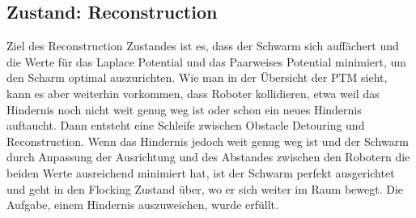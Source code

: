 \subsection{Zustand: Reconstruction}

Ziel des Reconstruction Zustandes ist es, dass der Schwarm sich auffächert und die Werte für das Laplace
Potential und das Paarweises Potential minimiert, um den Scharm optimal auszurichten.
Wie man in der Übersicht der PTM sieht, kann es aber weiterhin vorkommen, dass Roboter kollidieren, etwa weil
das Hindernis noch nicht weit genug weg ist oder schon ein neues Hindernis auftaucht. Dann entsteht eine
Schleife zwischen Obstacle Detouring und Reconstruction. Wenn das Hindernis jedoch weit genug weg ist und
der Schwarm durch Anpassung der Ausrichtung und des Abstandes zwischen den Robotern die beiden Werte 
ausreichend minimiert hat, ist der Schwarm perfekt ausgerichtet und geht in den Flocking Zustand über, wo 
er sich weiter im Raum bewegt. Die Aufgabe, einem Hindernis auszuweichen, wurde erfüllt.